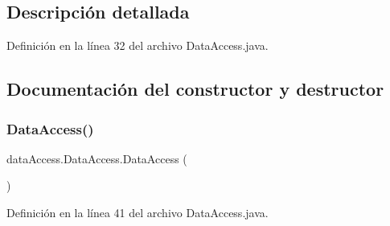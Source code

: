 \subsection{Descripción detallada}


Definición en la línea 32 del archivo Data\+Access.\+java.



\subsection{Documentación del constructor y destructor}
\mbox{\label{classdata_access_1_1_data_access_a4f66a4eefd8656ede2ffc4403af77346}} 
\subsubsection{\texorpdfstring{DataAccess()}{DataAccess()}}
{\footnotesize\ttfamily data\+Access.\+Data\+Access.\+Data\+Access (\begin{DoxyParamCaption}{ }\end{DoxyParamCaption})}



Definición en la línea 41 del archivo Data\+Access.\+java.


